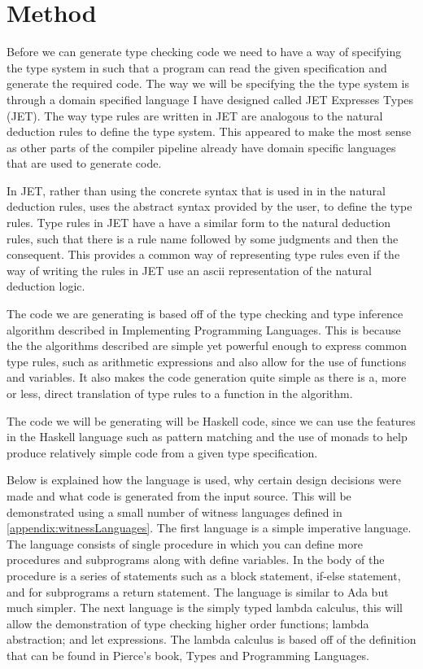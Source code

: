 \chapter{Method}
\label{chap:Method}
Before we can generate type checking code we need to have a way of specifying the type system in such that a program can read the given specification and generate the required code.
The way we will be specifying the the type system is through a domain specified language I have designed called JET Expresses Types (JET).
The way type rules are written in JET are analogous to the natural deduction rules to define the type system.
This appeared to make the most sense as other parts of the compiler pipeline already have domain specific languages that are used to generate code.

In JET, rather than using the concrete syntax that is used in in the natural deduction rules, uses the abstract syntax provided by the user, to define the type rules.
Type rules in JET have a have a similar form to the natural deduction rules, such that there is a rule name followed by some judgments and then the consequent.
This provides a common way of representing type rules even if the way of writing the rules in JET use an ascii representation of the natural deduction logic.

The code we are generating is based off of the type checking and type inference algorithm described in Implementing Programming Languages\cite{ranta2012implementing}.
This is because the the algorithms described are simple yet powerful enough to express common type rules, such as arithmetic expressions and also allow for the use of functions and variables.
It also makes the code generation quite simple as there is a, more or less, direct translation of type rules to a function in the algorithm.

The code we will be generating will be Haskell code, since we can use the features in the Haskell language such as pattern matching and the use of monads to help produce relatively simple code from a given type specification.

Below is explained how the language is used, why certain design decisions were made and what code is generated from the input source. 
This will be demonstrated using a small number of  witness languages defined in \autoref{appendix:witnessLanguages}.
The first language is a simple imperative language. 
The language consists of single procedure in which you can define more procedures and subprograms along with define variables. In the body of the procedure is a series of statements such as a block statement, if-else statement, and for subprograms a return statement. The language is similar to Ada but much simpler.
The next language is the simply typed lambda calculus, this will allow the demonstration of type checking higher order functions; lambda abstraction; and let expressions.
The lambda calculus is based off of the definition that can be found in Pierce's book, Types and Programming Languages\cite{pierce2002types}.





